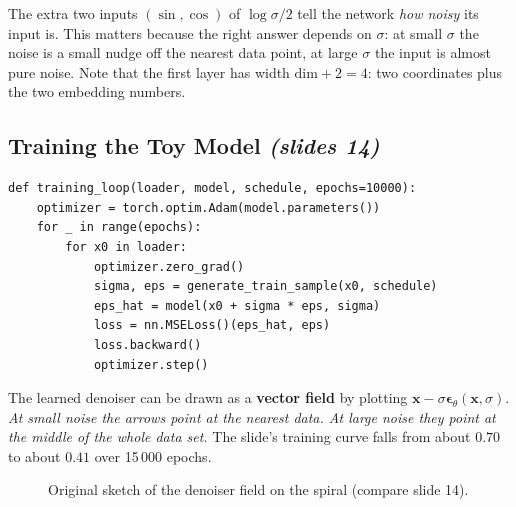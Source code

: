 \documentclass[11pt,a4paper]{article}
\newcommand{\bx}{\bm{x}}
\newcommand{\beps}{\bm{\epsilon}}
\newcommand{\slides}[1]{\texorpdfstring{\emph{(slides #1)}}{(slides #1)}}
\theoremstyle{plain}
\theoremstyle{definition}
\numberwithin{equation}{section}
\begin{document}
\begin{intuition}
The extra two inputs $(\sin,\cos)$ of $\log\sigma/2$ tell the network \emph{how noisy} its input is. This matters because the right answer depends on $\sigma$: at small $\sigma$ the noise is a small nudge off the nearest data point, at large $\sigma$ the input is almost pure noise. Note that the first layer has width $\text{dim}+2=4$: two coordinates plus the two embedding numbers.
\end{intuition}

\subsection{Training the Toy Model \slides{14}}
\begin{lstlisting}
def training_loop(loader, model, schedule, epochs=10000):
    optimizer = torch.optim.Adam(model.parameters())
    for _ in range(epochs):
        for x0 in loader:
            optimizer.zero_grad()
            sigma, eps = generate_train_sample(x0, schedule)
            eps_hat = model(x0 + sigma * eps, sigma)
            loss = nn.MSELoss()(eps_hat, eps)
            loss.backward()
            optimizer.step()
\end{lstlisting}
The learned denoiser can be drawn as a \textbf{vector field} by plotting $\bx-\sigma\beps_\theta(\bx,\sigma)$. \emph{At small noise the arrows point at the nearest data. At large noise they point at the middle of the whole data set.} The slide's training curve falls from about $0.70$ to about $0.41$ over 15\,000 epochs.

\begin{figure}[H]
\centering
{}
\caption{Original sketch of the denoiser field on the spiral (compare slide 14).}
\end{figure}
\end{document}
